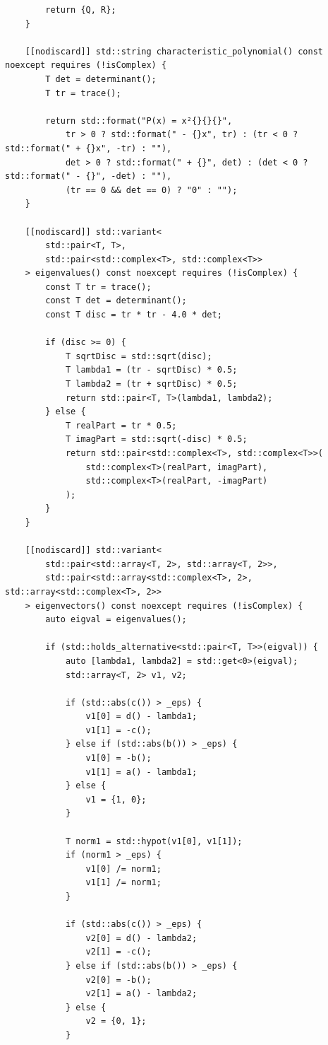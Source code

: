 \documentclass[11pt]{article}
\begin{document}
\begin{lstlisting}
        return {Q, R};
    }

    [[nodiscard]] std::string characteristic_polynomial() const noexcept requires (!isComplex) {
        T det = determinant();
        T tr = trace();

        return std::format("P(x) = x²{}{}{}",
            tr > 0 ? std::format(" - {}x", tr) : (tr < 0 ? std::format(" + {}x", -tr) : ""),
            det > 0 ? std::format(" + {}", det) : (det < 0 ? std::format(" - {}", -det) : ""),
            (tr == 0 && det == 0) ? "0" : "");
    }

    [[nodiscard]] std::variant<
        std::pair<T, T>,
        std::pair<std::complex<T>, std::complex<T>>
    > eigenvalues() const noexcept requires (!isComplex) {
        const T tr = trace();
        const T det = determinant();
        const T disc = tr * tr - 4.0 * det;
        
        if (disc >= 0) {
            T sqrtDisc = std::sqrt(disc);
            T lambda1 = (tr - sqrtDisc) * 0.5;
            T lambda2 = (tr + sqrtDisc) * 0.5;
            return std::pair<T, T>(lambda1, lambda2);
        } else {
            T realPart = tr * 0.5;
            T imagPart = std::sqrt(-disc) * 0.5;
            return std::pair<std::complex<T>, std::complex<T>>(
                std::complex<T>(realPart, imagPart),
                std::complex<T>(realPart, -imagPart)
            );
        }
    }

    [[nodiscard]] std::variant<
        std::pair<std::array<T, 2>, std::array<T, 2>>,
        std::pair<std::array<std::complex<T>, 2>, std::array<std::complex<T>, 2>>
    > eigenvectors() const noexcept requires (!isComplex) {
        auto eigval = eigenvalues();
        
        if (std::holds_alternative<std::pair<T, T>>(eigval)) {
            auto [lambda1, lambda2] = std::get<0>(eigval);
            std::array<T, 2> v1, v2;
            
            if (std::abs(c()) > _eps) {
                v1[0] = d() - lambda1;
                v1[1] = -c();
            } else if (std::abs(b()) > _eps) {
                v1[0] = -b();
                v1[1] = a() - lambda1;
            } else {
                v1 = {1, 0};
            }
            
            T norm1 = std::hypot(v1[0], v1[1]);
            if (norm1 > _eps) {
                v1[0] /= norm1;
                v1[1] /= norm1;
            }
            
            if (std::abs(c()) > _eps) {
                v2[0] = d() - lambda2;
                v2[1] = -c();
            } else if (std::abs(b()) > _eps) {
                v2[0] = -b();
                v2[1] = a() - lambda2;
            } else {
                v2 = {0, 1};
            }
            

\end{lstlisting}
\end{document}
